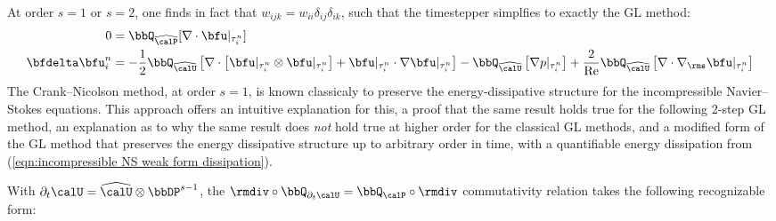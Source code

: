 \begin{example}
        At order $s = 1$ or $s = 2$, one finds in fact that $w_{ijk} = w_{ii}\delta_{ij}\delta_{ik}$, such that the timestepper simplfies to exactly the GL method:
        \begin{align}
                               0  &=  \bbQ_{\widehat{\calP}}[\nabla\cdot\bfu|_{\tau^{n}_{i}}]  \\
            \bfdelta\bfu^{n}_{i}  &=  - \frac{1}{2}\bbQ_{\widehat{\calU}}\left[\nabla\cdot\left[\bfu|_{\tau^{n}_{i}}\otimes\bfu|_{\tau^{n}_{i}}\right] + \bfu|_{\tau^{n}_{i}}\cdot\nabla\bfu|_{\tau^{n}_{i}}\right] - \bbQ_{\widehat{\calU}}\left[\nabla p|_{\tau^{n}_{i}}\right] + \frac{2}{\rmRe}\bbQ_{\widehat{\calU}}\left[\nabla\cdot\nabla_{\rms}\bfu|_{\tau^{n}_{i}}\right]
        \end{align}
        The Crank--Nicolson method, at order $s = 1$, is known classicaly to preserve the energy-dissipative structure for the incompressible Navier--Stokes equations. \BA{[Ref]} This approach offers an intuitive explanation for this, a proof that the same result holds true for the following 2-step GL method, an explanation as to why the same result does \emph{not} hold true at higher order for the classical GL methods, and a modified form of the GL method that preserves the energy dissipative structure up to arbitrary order in time, with a quantifiable energy dissipation from (\ref{eqn:incompressible NS weak form dissipation}).
        
        With $\partial_{t}\calU = \widehat{\calU}\otimes\bbDP^{s - 1}$, the $\rmdiv\circ\bbQ_{\partial_{t}\calU} = \bbQ_{\calP}\circ\rmdiv$ commutativity relation takes the following recognizable form:
        \begin{center}\end{center}
    \end{example}
